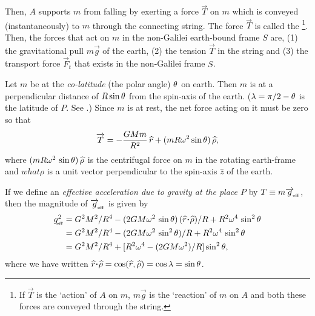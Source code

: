 Then, $A$ supports $m$ from falling by exerting a force 
$\vec{T}$ on $m$ which is conveyed (instantaneously) to $m$ 
through the connecting string. The force $\vec{T}$ is 
called 
the \footnote{If $\vec{T}$ is the `action' of $A$ on 
$m$, 
$m \vec{g}$ is the `reaction' of $m$ on $A$ and both these 
forces are conveyed through the string.}. Then, the forces 
that act on $m$ in the non-Galilei earth-bound frame $S$ 
are, (1) the gravitational pull $m\vec{g}$ of the earth, 
(2) 
the tension $\vec{T}$ in the string and (3) the transport 
force $\vec{F}_t $ that exists in the non-Galilei frame 
$S$. 
\begin{figure}[H]
\begin{center}
\caption{}\label{fig2.8}
\end{center}
\end{figure}

Let $m$ be at the \textsl{co-latitude} (\ie the {polar 
angle}) ${\theta}$ on earth. Then $m$ is at a perpendicular 
distance of $R \sin{\theta}$ from the spin-axis of the earth. 
($\lambda =\pi/2-{\theta}$ is the {latitude} of $P$. See 
.) Since $m$ is at rest, the net force 
acting on it must be zero so that
 \begin{align} \overrightarrow{T}
=-\frac{GMm}{R^2}\,{\widehat{r}} +(mR {\omega}^2\sin
{\theta})\, {\widehat{\rho}},
\end{align}
where $ (mR{\omega}^2\,\sin{\theta}) \, {\widehat{\rho}}$ is the
centrifugal force on $m$ in the rotating earth-frame and
$what{\rho}$ is a unit vector perpendicular to the spin-axis
$\hat{z}$ of the earth.

If we define an \textsl{effective acceleration due to 
gravity at the place $P$} by $ T\equiv 
m\overrightarrow{g}_{_{\hspace*{-1.5pt}{\text{eff}}}}$, then 
the magnitude of $\overrightarrow{g}_{_{\hspace*{-1.5pt}{\text{eff}}}}$ is given by
\begin{align}\label{bg.17}
g^2_\sfx{\text{eff}}&=G^2M^2/R^4
-(2GM\gkw^2\,\sin\gkq) \, (\hat{r}
\dotp\hat{\rho})/R+R^2\gkw^4\,\sin^2
\gkq \notag\\
&=G^2M^2/R^4 -(2GM\gkw^2\,\sin^2\gkq)/R +R^2\gkw^4\,\sin^2 
\gkq \notag\\
&=G^2M^2/R^4+
[R^2\gkw^4-(2GM\gkw^2)/R]\sin^2 \gkq,
\end{align}
where we have written $\hat{r}
\dotp\hat{\rho}=\cos(\hat{r},\hat{\rho}
)=\cos\lambda=\sin\gkq $. 

